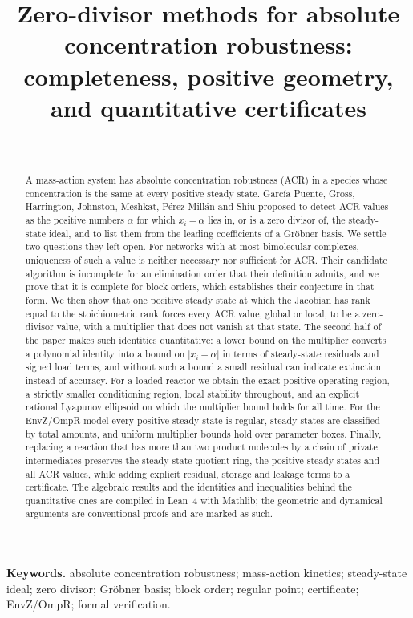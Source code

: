 \documentclass[11pt,a4paper]{article}
\title{Zero-divisor methods for absolute concentration robustness:\\[2pt]
\large completeness, positive geometry, and quantitative certificates}
\author{\PaperAuthor\\ \PaperAffiliation}
\date{\PaperDate}
\theoremstyle{plain}
\theoremstyle{definition}
\theoremstyle{remark}
\begin{document}
\maketitle

\begin{abstract}
A mass-action system has absolute concentration robustness (ACR) in a species whose concentration is the same at every positive steady state. Garc\'ia Puente, Gross, Harrington, Johnston, Meshkat, P\'erez Mill\'an and Shiu proposed to detect ACR values as the positive numbers $\alpha$ for which $x_i-\alpha$ lies in, or is a zero divisor of, the steady-state ideal, and to list them from the leading coefficients of a Gr\"obner basis. We settle two questions they left open. For networks with at most bimolecular complexes, uniqueness of such a value is neither necessary nor sufficient for ACR. Their candidate algorithm is incomplete for an elimination order that their definition admits, and we prove that it is complete for block orders, which establishes their conjecture in that form. We then show that one positive steady state at which the Jacobian has rank equal to the stoichiometric rank forces every ACR value, global or local, to be a zero-divisor value, with a multiplier that does not vanish at that state. The second half of the paper makes such identities quantitative: a lower bound on the multiplier converts a polynomial identity into a bound on $|x_i-\alpha|$ in terms of steady-state residuals and signed load terms, and without such a bound a small residual can indicate extinction instead of accuracy. For a loaded reactor we obtain the exact positive operating region, a strictly smaller conditioning region, local stability throughout, and an explicit rational Lyapunov ellipsoid on which the multiplier bound holds for all time. For the EnvZ/OmpR model every positive steady state is regular, steady states are classified by total amounts, and uniform multiplier bounds hold over parameter boxes. Finally, replacing a reaction that has more than two product molecules by a chain of private intermediates preserves the steady-state quotient ring, the positive steady states and all ACR values, while adding explicit residual, storage and leakage terms to a certificate. The algebraic results and the identities and inequalities behind the quantitative ones are compiled in Lean~4 with Mathlib; the geometric and dynamical arguments are conventional proofs and are marked as such.
\end{abstract}

\noindent\textbf{Keywords.} absolute concentration robustness; mass-action kinetics; steady-state ideal; zero divisor; Gr\"obner basis; block order; regular point; certificate; EnvZ/OmpR; formal verification.
\end{document}
